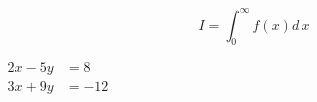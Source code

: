 \documentclass[multi=page,preview,varwidth,border=5pt]{standalone}
\begin{document}

\begin{page}
\[
I = \int_0^\infty f(x)d\,x 
\]
\end{page}

\begin{page}
\(
\begin{aligned}
2x - 5y &= 8  \\ 
3x + 9y &= -12
\end{aligned}
\)
\end{page}
\end{document}
